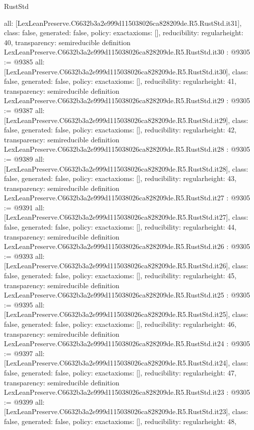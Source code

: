 \begin{lexlean}{RustStd}
\begin{coremodule}
{  all: [LexLeanPreserve.C6632b3a2e999d115038026ca828209de.R5.RustStd.it31],
  class: false,
  generated: false,
  policy: exact{axioms: []},
  reducibility: regular{height: 40},
  transparency: semireducible
}
definition LexLeanPreserve.C6632b3a2e999d115038026ca828209de.R5.RustStd.it30 : @9305 := @9385 {
  all: [LexLeanPreserve.C6632b3a2e999d115038026ca828209de.R5.RustStd.it30],
  class: false,
  generated: false,
  policy: exact{axioms: []},
  reducibility: regular{height: 41},
  transparency: semireducible
}
definition LexLeanPreserve.C6632b3a2e999d115038026ca828209de.R5.RustStd.it29 : @9305 := @9387 {
  all: [LexLeanPreserve.C6632b3a2e999d115038026ca828209de.R5.RustStd.it29],
  class: false,
  generated: false,
  policy: exact{axioms: []},
  reducibility: regular{height: 42},
  transparency: semireducible
}
definition LexLeanPreserve.C6632b3a2e999d115038026ca828209de.R5.RustStd.it28 : @9305 := @9389 {
  all: [LexLeanPreserve.C6632b3a2e999d115038026ca828209de.R5.RustStd.it28],
  class: false,
  generated: false,
  policy: exact{axioms: []},
  reducibility: regular{height: 43},
  transparency: semireducible
}
definition LexLeanPreserve.C6632b3a2e999d115038026ca828209de.R5.RustStd.it27 : @9305 := @9391 {
  all: [LexLeanPreserve.C6632b3a2e999d115038026ca828209de.R5.RustStd.it27],
  class: false,
  generated: false,
  policy: exact{axioms: []},
  reducibility: regular{height: 44},
  transparency: semireducible
}
definition LexLeanPreserve.C6632b3a2e999d115038026ca828209de.R5.RustStd.it26 : @9305 := @9393 {
  all: [LexLeanPreserve.C6632b3a2e999d115038026ca828209de.R5.RustStd.it26],
  class: false,
  generated: false,
  policy: exact{axioms: []},
  reducibility: regular{height: 45},
  transparency: semireducible
}
definition LexLeanPreserve.C6632b3a2e999d115038026ca828209de.R5.RustStd.it25 : @9305 := @9395 {
  all: [LexLeanPreserve.C6632b3a2e999d115038026ca828209de.R5.RustStd.it25],
  class: false,
  generated: false,
  policy: exact{axioms: []},
  reducibility: regular{height: 46},
  transparency: semireducible
}
definition LexLeanPreserve.C6632b3a2e999d115038026ca828209de.R5.RustStd.it24 : @9305 := @9397 {
  all: [LexLeanPreserve.C6632b3a2e999d115038026ca828209de.R5.RustStd.it24],
  class: false,
  generated: false,
  policy: exact{axioms: []},
  reducibility: regular{height: 47},
  transparency: semireducible
}
definition LexLeanPreserve.C6632b3a2e999d115038026ca828209de.R5.RustStd.it23 : @9305 := @9399 {
  all: [LexLeanPreserve.C6632b3a2e999d115038026ca828209de.R5.RustStd.it23],
  class: false,
  generated: false,
  policy: exact{axioms: []},
  reducibility: regular{height: 48},
}
\end{coremodule}
\end{lexlean}
